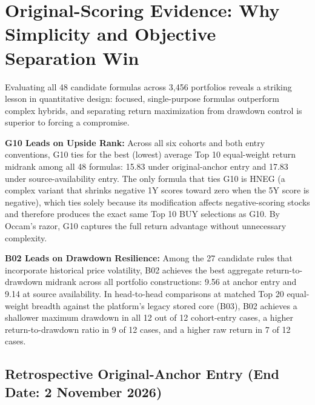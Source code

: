 \documentclass[11pt,a4paper]{article}
\numberwithin{table}{section}
\begin{document}
\section{Original-Scoring Evidence: Why Simplicity and Objective Separation Win}

Evaluating all 48 candidate formulas across 3,456 portfolios reveals a striking lesson in quantitative design: focused, single-purpose formulas outperform complex hybrids, and separating return maximization from drawdown control is superior to forcing a compromise.

\textbf{G10 Leads on Upside Rank:}  Across all six cohorts and both entry conventions, G10 ties for the best (lowest) average Top 10 equal-weight return midrank among all 48 formulas: 15.83 under original-anchor entry and 17.83 under source-availability entry. The only formula that ties G10 is HNEG (a complex variant that shrinks negative 1Y scores toward zero when the 5Y score is negative), which ties solely because its modification affects negative-scoring stocks and therefore produces the exact same Top 10 BUY selections as G10. By Occam's razor, G10 captures the full return advantage without unnecessary complexity.

\textbf{B02 Leads on Drawdown Resilience:}  Among the 27 candidate rules that incorporate historical price volatility, B02 achieves the best aggregate return-to-drawdown midrank across all portfolio constructions: 9.56 at anchor entry and 9.14 at source availability. In head-to-head comparisons at matched Top 20 equal-weight breadth against the platform's legacy stored core (B03), B02 achieves a shallower maximum drawdown in all 12 out of 12 cohort-entry cases, a higher return-to-drawdown ratio in 9 of 12 cases, and a higher raw return in 7 of 12 cases.

\subsection{Retrospective Original-Anchor Entry (End Date: 2 November 2026)}
\end{document}
